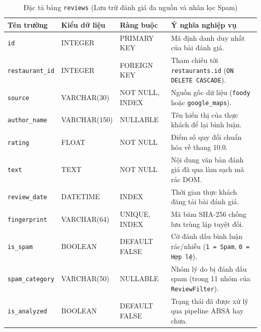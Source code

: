 \documentclass[12pt, a4paper]{article}
\begin{document}
\begin{table}[H]
\centering
\caption{Đặc tả bảng \texttt{reviews} (Lưu trữ đánh giá đa nguồn và nhãn lọc Spam)}
\label{tab:schema_reviews}
\vspace{0.15cm}
\footnotesize
\begin{tabularx}{\textwidth}{l l l X}
\toprule
\rowcolor{blue!8}
\textbf{Tên trường} & \textbf{Kiểu dữ liệu} & \textbf{Ràng buộc} & \textbf{Ý nghĩa nghiệp vụ} \\
\midrule
\texttt{id} & INTEGER & PRIMARY KEY & Mã định danh duy nhất của bài đánh giá. \\
\texttt{restaurant\_id} & INTEGER & FOREIGN KEY & Tham chiếu tới \texttt{restaurants.id} (\texttt{ON DELETE CASCADE}). \\
\texttt{source} & VARCHAR(30) & NOT NULL, INDEX & Nguồn gốc dữ liệu (\texttt{foody} hoặc \texttt{google\_maps}). \\
\texttt{author\_name} & VARCHAR(150) & NULLABLE & Tên hiển thị của thực khách để lại bình luận. \\
\texttt{rating} & FLOAT & NOT NULL & Điểm số quy đổi chuẩn hóa về thang 10.0. \\
\texttt{text} & TEXT & NOT NULL & Nội dung văn bản đánh giá đã qua làm sạch mã rác DOM. \\
\texttt{review\_date} & DATETIME & INDEX & Thời gian thực khách đăng tải bài đánh giá. \\
\texttt{fingerprint} & VARCHAR(64) & UNIQUE, INDEX & Mã băm SHA-256 chống lưu trùng lặp tuyệt đối. \\
\texttt{is\_spam} & BOOLEAN & DEFAULT FALSE & Cờ đánh dấu bình luận rác/nhiễu (\texttt{1 = Spam}, \texttt{0 = Hợp lệ}). \\
\texttt{spam\_category} & VARCHAR(50) & NULLABLE & Nhóm lý do bị đánh dấu spam (trong 11 nhóm của \texttt{ReviewFilter}). \\
\texttt{is\_analyzed} & BOOLEAN & DEFAULT FALSE & Trạng thái đã được xử lý qua pipeline ABSA hay chưa. \\
\bottomrule
\end{tabularx}
\end{table}
\end{document}
